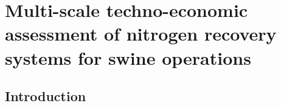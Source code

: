 \chapter{Multi-scale techno-economic assessment of nitrogen recovery systems for swine operations}\label{ch:NitrogenTechs}
\section{Introduction}
